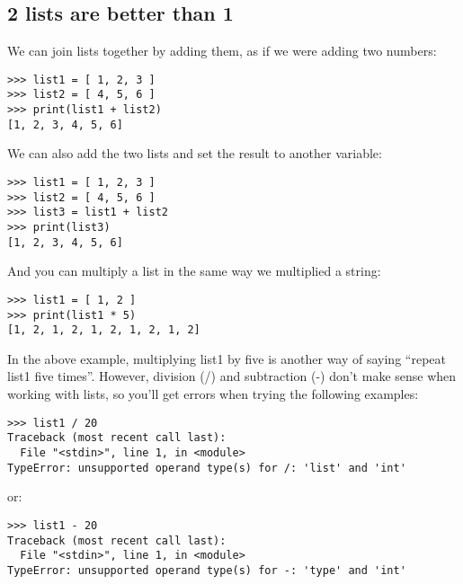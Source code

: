 \subsection*{\color{BrickRed}2 lists are better than 1}

We can join lists together by adding them, as if we were adding two numbers:

\begin{listing}
\begin{verbatim}
>>> list1 = [ 1, 2, 3 ]
>>> list2 = [ 4, 5, 6 ]
>>> print(list1 + list2)
[1, 2, 3, 4, 5, 6]
\end{verbatim}
\end{listing}

\noindent
We can also add the two lists and set the result to another variable:

\begin{listing}
\begin{verbatim}
>>> list1 = [ 1, 2, 3 ]
>>> list2 = [ 4, 5, 6 ]
>>> list3 = list1 + list2
>>> print(list3)
[1, 2, 3, 4, 5, 6]
\end{verbatim}
\end{listing}

\noindent
And you can multiply a list in the same way we multiplied a string:

\begin{listing}
\begin{verbatim}
>>> list1 = [ 1, 2 ]
>>> print(list1 * 5)
[1, 2, 1, 2, 1, 2, 1, 2, 1, 2]
\end{verbatim}
\end{listing}

\noindent
In the above example, multiplying list1 by five is another way of saying ``repeat list1 five times''. However, division (/) and subtraction (-) don't make sense when working with lists, so you'll get errors when trying the following examples:

\begin{listing}
\begin{verbatim}
>>> list1 / 20
Traceback (most recent call last):
  File "<stdin>", line 1, in <module>
TypeError: unsupported operand type(s) for /: 'list' and 'int'
\end{verbatim}
\end{listing}

\noindent
or:

\begin{listing}
\begin{verbatim}
>>> list1 - 20
Traceback (most recent call last):
  File "<stdin>", line 1, in <module>
TypeError: unsupported operand type(s) for -: 'type' and 'int'
\end{verbatim}
\end{listing}

